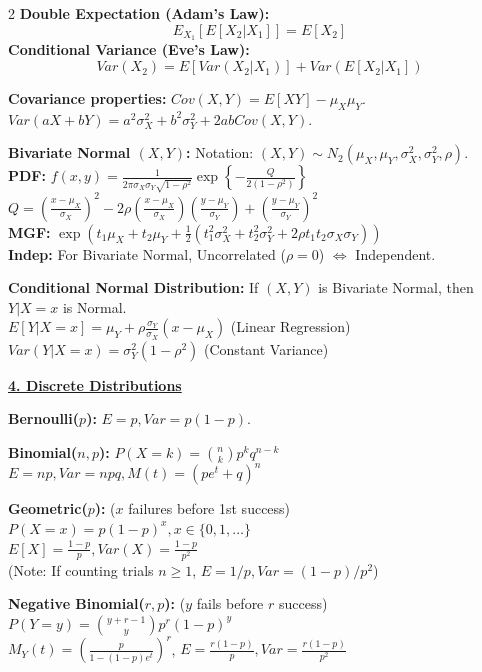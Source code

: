 \documentclass{article}
\newcommand{\sectiontitle}[1]{\vspace{0.1cm}\textbf{\underline{#1}}\vspace{0.1cm}}
\newcommand{\distname}[1]{\textbf{#1}}
\begin{document}
\begin{multicols*}{2}
\distname{Double Expectation (Adam's Law):}
\[ E_{X_1}[E[X_2|X_1]] = E[X_2] \]
\distname{Conditional Variance (Eve's Law):}
\[ Var(X_2) = E[Var(X_2|X_1)] + Var(E[X_2|X_1]) \]

\distname{Covariance properties:}
$Cov(X,Y) = E[XY] - \mu_X \mu_Y$.
$Var(aX+bY) = a^2\sigma_X^2 + b^2\sigma_Y^2 + 2ab Cov(X,Y)$.

\distname{Bivariate Normal $(X,Y)$:}
Notation: $(X,Y) \sim N_2(\mu_X, \mu_Y, \sigma_X^2, \sigma_Y^2, \rho)$.
\\ \textbf{PDF:} $f(x,y) = \frac{1}{2\pi \sigma_X \sigma_Y \sqrt{1-\rho^2}} \exp\left\{-\frac{Q}{2(1-\rho^2)}\right\}$
\\ $Q = (\frac{x-\mu_X}{\sigma_X})^2 - 2\rho(\frac{x-\mu_X}{\sigma_X})(\frac{y-\mu_Y}{\sigma_Y}) + (\frac{y-\mu_Y}{\sigma_Y})^2$
\\ \textbf{MGF:} $\exp(t_1\mu_X + t_2\mu_Y + \frac{1}{2}(t_1^2\sigma_X^2 + t_2^2\sigma_Y^2 + 2\rho t_1 t_2 \sigma_X \sigma_Y))$
\\ \textbf{Indep:} For Bivariate Normal, Uncorrelated ($\rho=0$) $\iff$ Independent.

\distname{Conditional Normal Distribution:}
If $(X,Y)$ is Bivariate Normal, then $Y|X=x$ is Normal.
\\ $E[Y|X=x] = \mu_Y + \rho \frac{\sigma_Y}{\sigma_X}(x-\mu_X)$ (Linear Regression)
\\ $Var(Y|X=x) = \sigma_Y^2(1-\rho^2)$ (Constant Variance)

\sectiontitle{4. Discrete Distributions}

\distname{Bernoulli($p$):} $E=p, Var=p(1-p)$.

\distname{Binomial($n, p$):}
$P(X=k) = \binom{n}{k} p^k q^{n-k}$
\\ $E=np, Var=npq, M(t)=(pe^t+q)^n$

\distname{Geometric($p$):} ($x$ failures before 1st success)
$P(X=x) = p(1-p)^x, x \in \{0, 1, \dots\}$
\\ $E[X] = \frac{1-p}{p}, Var(X) = \frac{1-p}{p^2}$
\\ (Note: If counting trials $n \ge 1$, $E=1/p, Var=(1-p)/p^2$)

\distname{Negative Binomial($r, p$):} ($y$ fails before $r$ success)
$P(Y=y) = \binom{y+r-1}{y} p^r (1-p)^y$
\\ $M_Y(t) = (\frac{p}{1-(1-p)e^t})^r$, $E=\frac{r(1-p)}{p}, Var=\frac{r(1-p)}{p^2}$


\end{multicols*}
\end{document}
